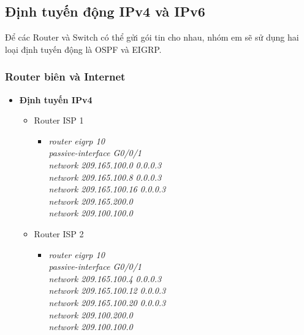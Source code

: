 \documentclass[12pt,a4paper]{report}
\begin{document}
\subsection{Định tuyến động IPv4 và IPv6}
\hspace*{1cm}Để các Router và Switch có thể gửi gói tin cho nhau, nhóm em sẽ sử dụng hai loại định tuyến động là OSPF và EIGRP.\\
\subsubsection{Router biên và Internet}


\begin{itemize}
      \item \textbf{Định tuyến IPv4}
      \begin{itemize}
        \item Router ISP 1
        \begin{itemize}
          \item \textit{router eigrp 10\\
passive-interface G0/0/1\\
network 209.165.100.0 0.0.0.3\\
network 209.165.100.8 0.0.0.3\\
network 209.165.100.16 0.0.0.3\\
network 209.165.200.0\\
network 209.100.100.0\\}
        
        \end{itemize}
        \item Router ISP 2
        \begin{itemize}
         \item \textit{router eigrp 10\\
passive-interface G0/0/1\\
network 209.165.100.4 0.0.0.3\\
network 209.165.100.12 0.0.0.3\\
network 209.165.100.20 0.0.0.3\\
network 209.100.200.0\\
network 209.100.100.0\\}
         

\end{itemize}
\end{itemize}
\end{itemize}
\end{document}

